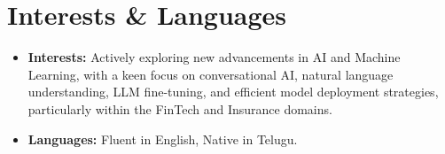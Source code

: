 \documentclass[11pt]{article}
\begin{document}
\section*{Interests \& Languages}
\begin{itemize}[leftmargin=*,labelsep=0.5em]
    \item \textbf{Interests:} Actively exploring new advancements in AI and Machine Learning, with a keen focus on conversational AI, natural language understanding, LLM fine-tuning, and efficient model deployment strategies, particularly within the FinTech and Insurance domains.
    \item \textbf{Languages:} Fluent in English, Native in Telugu.
\end{itemize}
\end{document}
